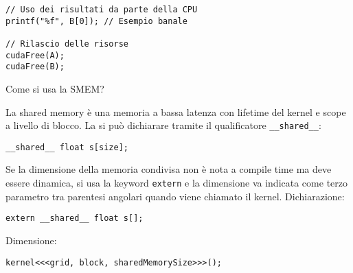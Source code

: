 \begin{questions}
\begin{solution}
\begin{verbatim}
// Uso dei risultati da parte della CPU
printf("%f", B[0]); // Esempio banale

// Rilascio delle risorse
cudaFree(A);
cudaFree(B);
        \end{verbatim}
    \end{solution}
    
    \question Come si usa la SMEM?
    
    \begin{solution}
        La shared memory è una memoria a bassa latenza con lifetime del kernel e scope a livello di blocco. La si può dichiarare tramite il qualificatore \texttt{\_\_shared\_\_}:
        \begin{verbatim}
__shared__ float s[size];
        \end{verbatim}
        
        Se la dimensione della memoria condivisa non è nota a compile time ma deve essere dinamica, si usa la keyword \texttt{extern} e la dimensione va indicata come terzo parametro tra parentesi angolari quando viene chiamato il kernel. Dichiarazione:
        \begin{verbatim}
extern __shared__ float s[];
        \end{verbatim}
        Dimensione:
        \begin{verbatim}
kernel<<<grid, block, sharedMemorySize>>>();
        \end{verbatim}
    \end{solution}
    
    
\end{questions}